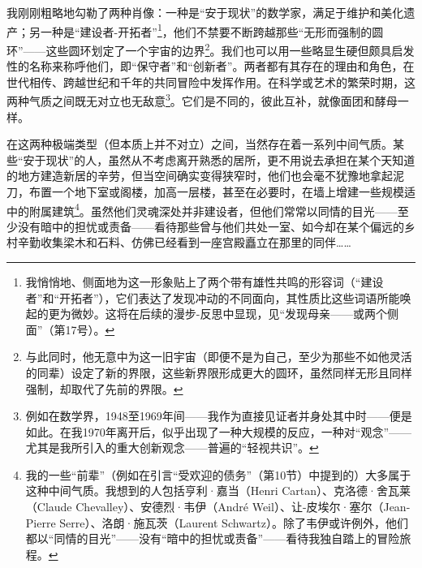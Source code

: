 我刚刚粗略地勾勒了两种肖像：一种是“安于现状”的数学家，满足于维护和美化遗产；另一种是“建设者-开拓者”\footnote{我悄悄地、侧面地为这一形象贴上了两个带有雄性共鸣的形容词（“建设者”和“开拓者”），它们表达了发现冲动的不同面向，其性质比这些词语所能唤起的更为微妙。这将在后续的漫步-反思中显现，见“发现母亲——或两个侧面”（第17号）。}，他们不禁要不断跨越那些“无形而强制的圆环”——这些圆环划定了一个宇宙的边界\footnote{与此同时，他无意中为这一旧宇宙（即便不是为自己，至少为那些不如他灵活的同辈）设定了新的界限，这些新界限形成更大的圆环，虽然同样无形且同样强制，却取代了先前的界限。}。我们也可以用一些略显生硬但颇具启发性的名称来称呼他们，即“保守者”和“创新者”。两者都有其存在的理由和角色，在世代相传、跨越世纪和千年的共同冒险中发挥作用。在科学或艺术的繁荣时期，这两种气质之间既无对立也无敌意\footnote{例如在数学界，1948至1969年间——我作为直接见证者并身处其中时——便是如此。在我1970年离开后，似乎出现了一种大规模的反应，一种对“观念”——尤其是我所引入的重大创新观念——普遍的“轻视共识”。}。它们是不同的，彼此互补，就像面团和酵母一样。

在这两种极端类型（但本质上并不对立）之间，当然存在着一系列中间气质。某些“安于现状”的人，虽然从不考虑离开熟悉的居所，更不用说去承担在某个天知道的地方建造新居的辛劳，但当空间确实变得狭窄时，他们也会毫不犹豫地拿起泥刀，布置一个地下室或阁楼，加高一层楼，甚至在必要时，在墙上增建一些规模适中的附属建筑\footnote{我的一些“前辈”（例如在引言“受欢迎的债务”（第10节）中提到的）大多属于这种中间气质。我想到的人包括亨利·嘉当（Henri Cartan）、克洛德·舍瓦莱（Claude Chevalley）、安德烈·韦伊（André Weil）、让-皮埃尔·塞尔（Jean-Pierre Serre）、洛朗·施瓦茨（Laurent Schwartz）。除了韦伊或许例外，他们都以“同情的目光”——没有“暗中的担忧或责备”——看待我独自踏上的冒险旅程。}。虽然他们灵魂深处并非建设者，但他们常常以同情的目光——至少没有暗中的担忧或责备——看待那些曾与他们共处一室、如今却在某个偏远的乡村辛勤收集梁木和石料、仿佛已经看到一座宫殿矗立在那里的同伴……